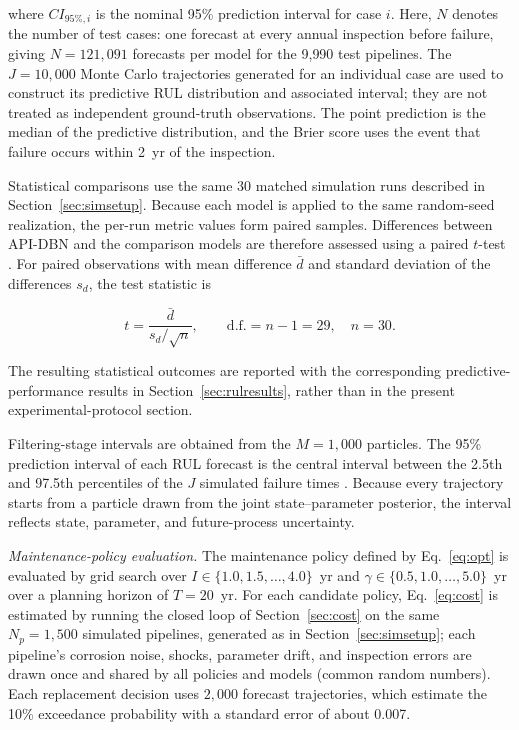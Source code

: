 \documentclass[journal]{IEEEtran}
\begin{document}
where $CI_{95\%,i}$ is the nominal 95\% prediction interval for case
$i$. Here, $N$ denotes the number of test cases: one forecast at every
annual inspection before failure, giving $N=121{,}091$ forecasts per
model for the 9{,}990 test pipelines. The $J=10{,}000$ Monte Carlo
trajectories generated for an individual case are used to construct its
predictive RUL distribution and associated interval; they are not
treated as independent ground-truth observations. The point prediction
is the median of the predictive distribution, and the Brier score uses
the event that failure occurs within 2~yr of the inspection.

Statistical comparisons use the same 30 matched simulation runs
described in Section~\ref{sec:simsetup}. Because each model is applied
to the same random-seed realization, the per-run metric values form
paired samples. Differences between API-DBN and the comparison models
are therefore assessed using a paired $t$-test
\cite{montgomery2017}. For paired observations with mean difference
$\bar d$ and standard deviation of the differences $s_d$, the test
statistic is

\begin{equation}
t
=
\frac{\bar d}{s_d/\sqrt{n}},
\qquad
\mathrm{d.f.}=n-1=29,
\quad n=30.
\label{eq:ttest}
\end{equation}

The resulting statistical outcomes are reported with the corresponding
predictive-performance results in Section~\ref{sec:rulresults}, rather
than in the present experimental-protocol section.

Filtering-stage intervals are obtained from the $M=1{,}000$ particles.
The 95\% prediction interval of each RUL forecast is the central
interval between the 2.5th and 97.5th percentiles of the $J$ simulated
failure times \cite{efron1993}. Because every trajectory starts from a
particle drawn from the joint state--parameter posterior, the interval
reflects state, parameter, and future-process uncertainty.



\textit{Maintenance-policy evaluation.}
The maintenance policy defined by Eq.~\eqref{eq:opt} is evaluated by
grid search over $I\in\{1.0,1.5,\dots,4.0\}$~yr and
$\gamma\in\{0.5,1.0,\dots,5.0\}$~yr over a planning horizon of
$T=20$~yr. For each candidate policy, Eq.~\eqref{eq:cost} is estimated
by running the closed loop of Section~\ref{sec:cost} on the same
$N_p=1{,}500$ simulated pipelines, generated as in
Section~\ref{sec:simsetup}; each pipeline's corrosion noise, shocks,
parameter drift, and inspection errors are drawn once and shared by all
policies and models (common random numbers). Each replacement decision
uses $2{,}000$ forecast trajectories, which estimate the 10\%
exceedance probability with a standard error of about 0.007.
\end{document}
